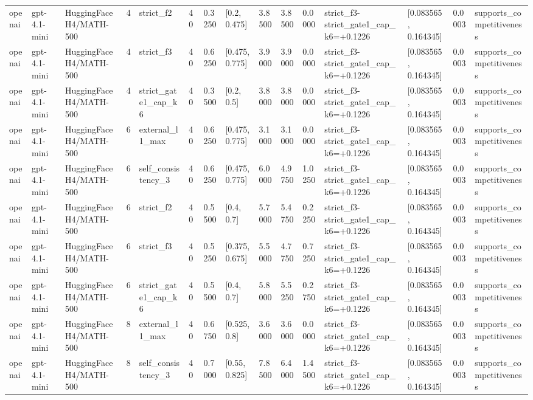 \begin{tabular}{lllllllllllllll}
openai & gpt-4.1-mini & HuggingFaceH4/MATH-500 & 4 & strict\_f2 & 40 & 0.3250 & [0.2, 0.475] & 3.8500 & 3.8500 & 0.0000 & strict\_f3-strict\_gate1\_cap\_k6=+0.1226 & [0.083565, 0.164345] & 0.0003 & supports\_competitiveness \\
openai & gpt-4.1-mini & HuggingFaceH4/MATH-500 & 4 & strict\_f3 & 40 & 0.6250 & [0.475, 0.775] & 3.9000 & 3.9000 & 0.0000 & strict\_f3-strict\_gate1\_cap\_k6=+0.1226 & [0.083565, 0.164345] & 0.0003 & supports\_competitiveness \\
openai & gpt-4.1-mini & HuggingFaceH4/MATH-500 & 4 & strict\_gate1\_cap\_k6 & 40 & 0.3500 & [0.2, 0.5] & 3.8000 & 3.8000 & 0.0000 & strict\_f3-strict\_gate1\_cap\_k6=+0.1226 & [0.083565, 0.164345] & 0.0003 & supports\_competitiveness \\
openai & gpt-4.1-mini & HuggingFaceH4/MATH-500 & 6 & external\_l1\_max & 40 & 0.6250 & [0.475, 0.775] & 3.1000 & 3.1000 & 0.0000 & strict\_f3-strict\_gate1\_cap\_k6=+0.1226 & [0.083565, 0.164345] & 0.0003 & supports\_competitiveness \\
openai & gpt-4.1-mini & HuggingFaceH4/MATH-500 & 6 & self\_consistency\_3 & 40 & 0.6250 & [0.475, 0.775] & 6.0000 & 4.9750 & 1.0250 & strict\_f3-strict\_gate1\_cap\_k6=+0.1226 & [0.083565, 0.164345] & 0.0003 & supports\_competitiveness \\
openai & gpt-4.1-mini & HuggingFaceH4/MATH-500 & 6 & strict\_f2 & 40 & 0.5500 & [0.4, 0.7] & 5.7000 & 5.4750 & 0.2250 & strict\_f3-strict\_gate1\_cap\_k6=+0.1226 & [0.083565, 0.164345] & 0.0003 & supports\_competitiveness \\
openai & gpt-4.1-mini & HuggingFaceH4/MATH-500 & 6 & strict\_f3 & 40 & 0.5250 & [0.375, 0.675] & 5.5000 & 4.7750 & 0.7250 & strict\_f3-strict\_gate1\_cap\_k6=+0.1226 & [0.083565, 0.164345] & 0.0003 & supports\_competitiveness \\
openai & gpt-4.1-mini & HuggingFaceH4/MATH-500 & 6 & strict\_gate1\_cap\_k6 & 40 & 0.5500 & [0.4, 0.7] & 5.8000 & 5.5250 & 0.2750 & strict\_f3-strict\_gate1\_cap\_k6=+0.1226 & [0.083565, 0.164345] & 0.0003 & supports\_competitiveness \\
openai & gpt-4.1-mini & HuggingFaceH4/MATH-500 & 8 & external\_l1\_max & 40 & 0.6750 & [0.525, 0.8] & 3.6000 & 3.6000 & 0.0000 & strict\_f3-strict\_gate1\_cap\_k6=+0.1226 & [0.083565, 0.164345] & 0.0003 & supports\_competitiveness \\
openai & gpt-4.1-mini & HuggingFaceH4/MATH-500 & 8 & self\_consistency\_3 & 40 & 0.7000 & [0.55, 0.825] & 7.8500 & 6.4000 & 1.4500 & strict\_f3-strict\_gate1\_cap\_k6=+0.1226 & [0.083565, 0.164345] & 0.0003 & supports\_competitiveness \\

\end{tabular}
